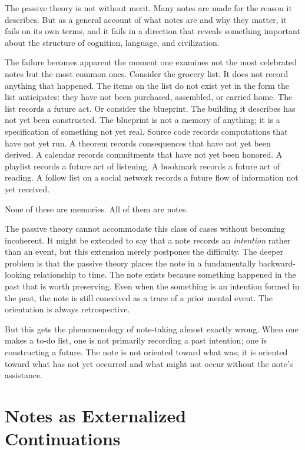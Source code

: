\documentclass[12pt, a4paper]{article}
\begin{document}
The passive theory is not without merit. Many notes are made for the reason it
describes. But as a general account of what notes are and why they matter, it
fails on its own terms, and it fails in a direction that reveals something
important about the structure of cognition, language, and civilization.

The failure becomes apparent the moment one examines not the most celebrated notes
but the most common ones. Consider the grocery list. It does not record anything
that happened. The items on the list do not exist yet in the form the list
anticipates: they have not been purchased, assembled, or carried home. The list
records a future act. Or consider the blueprint. The building it describes has not
yet been constructed. The blueprint is not a memory of anything; it is a
specification of something not yet real. Source code records computations that
have not yet run. A theorem records consequences that have not yet been derived. A
calendar records commitments that have not yet been honored. A playlist records a
future act of listening. A bookmark records a future act of reading. A follow list
on a social network records a future flow of information not yet received.

None of these are memories. All of them are notes.

The passive theory cannot accommodate this class of cases without becoming
incoherent. It might be extended to say that a note records an \emph{intention}
rather than an event, but this extension merely postpones the difficulty. The
deeper problem is that the passive theory places the note in a fundamentally
backward-looking relationship to time. The note exists because something happened
in the past that is worth preserving. Even when the something is an intention
formed in the past, the note is still conceived as a trace of a prior mental
event. The orientation is always retrospective.

But this gets the phenomenology of note-taking almost exactly wrong. When one
makes a to-do list, one is not primarily recording a past intention; one is
constructing a future. The note is not oriented toward what was; it is oriented
toward what has not yet occurred and what might not occur without the note's
assistance.

\section{Notes as Externalized Continuations}
\end{document}

